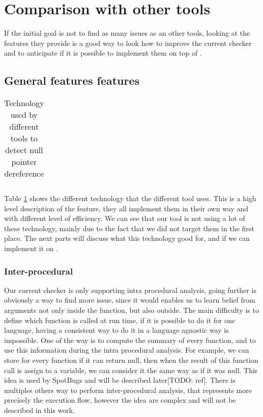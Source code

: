 \section{Comparison with other tools}
\label{sec:comparison}

If the initial goal is not to find as many issues as an other tools, looking at the features they provide is a good way to look how to improve the current checker and to anticipate if it is possible to implement them on top of \slang.


\subsection{General features features}
\label{subsec:general_features}

\begin{table}[h]
	\centering
	\caption{Technology used by different tools to detect null pointer dereference}
	\label{table:tools_features}
	\begin{tabular}{|c|c|}
		\hline
	\end{tabular}
\end{table}

Table \ref{table:tools_features} shows the different technology that the different tool uses. 
This is a high level description of the feature, they all implement them in their own way and with different level of efficiency. 
We can see that our tool is not using a lot of these technology, mainly due to the fact that we did not target them in the first place. 
The next parts will discuss what this technology good for, and if we can implement it on \slang.


\subsubsection{Inter-procedural}
\label{subsubsec:inter_procedrual}

Our current checker is only supporting intra procedural analysis, going further is obviously a way to find more issue, since it would enables us to learn belief from arguments not only inside the function, but also outside. 
The main difficulty is to define which function is called at run time, if it is possible to do it for one language, having a consistent way to do it in a language agnostic way is impossible. One of the way is to compute the summary of every function, and to use this information during the intra procedural analysis. 
For example, we can store for every function if it can return null, then when the result of this function call is assign to a variable, we can consider it the same way as if it was null. 
This idea is used by SpotBugs and will be described later[TODO: ref]. 
There is multiples others way to perform inter-procedural analysis, that represents more precisely the execution flow, however the idea are complex and will not be described in this work.

